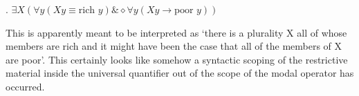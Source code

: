 \begin{enumerate}
  \ex. $\exists X(\forall y(Xy \equiv \mbox{rich } y) \& \diamond\forall y(Xy \rightarrow \mbox{poor }y))$
  
  This is apparently meant to be interpreted as `there is a plurality X all of whose members are rich and it might have been the case that all of the members of X are poor'. This certainly looks like somehow a syntactic scoping of the restrictive material inside the universal quantifier out of the scope of the modal operator has occurred.
\end{enumerate}

% 
% 
% 
% 
% 
% 
% 
% 
% 
% 
